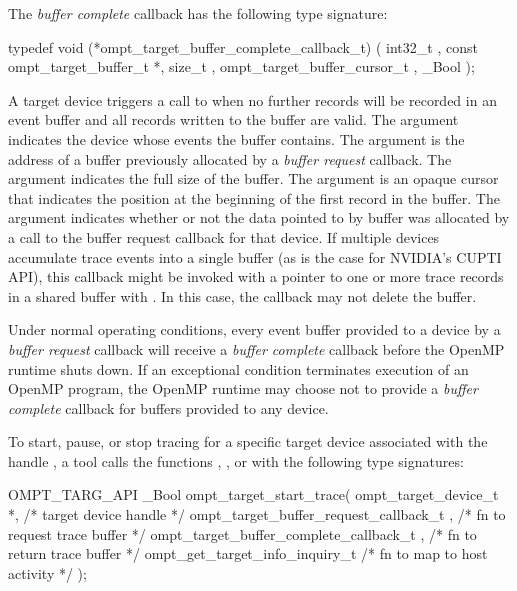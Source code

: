 \documentclass{article}
\begin{document}
The \emph{buffer complete} callback has the following type signature: 
\begin{boxedcode}
typedef void (*ompt\_target\_buffer\_complete\_callback\_t) (
  int32\_t , 
  const ompt\_target\_buffer\_t *,
  size\_t ,
  ompt\_target\_buffer\_cursor\_t ,
  \_Bool 
);
\end{boxedcode}
A target device triggers a call to  when no further records will be recorded in an event buffer and all records written to the buffer are valid. 
The argument  indicates the device whose events the buffer contains. The argument  is the address of a buffer previously allocated by a \emph{buffer request} callback. The argument  indicates the full size of the buffer. The argument  is an opaque cursor that indicates the position at the beginning of the first record in the buffer. The argument  indicates whether or not the data pointed to by buffer was allocated by a call to the buffer request callback for that device. If multiple devices accumulate trace events into a single buffer (as is the case for NVIDIA's CUPTI API), this callback might be invoked with a pointer to one or more trace records in a shared buffer with . In this case, the callback may not delete the buffer.

Under normal operating conditions, every event buffer provided to a device by a \emph{buffer request} callback will receive a \emph{buffer complete} callback before the OpenMP runtime shuts down. If an exceptional condition terminates  execution of an OpenMP program, the OpenMP runtime may choose not to provide a \emph{buffer complete} callback for buffers provided to any device.

To start, pause, or stop tracing for a specific target device associated with the handle , 
a tool calls the functions , , or  with the following type signatures:
\begin{boxedcode}
OMPT\_TARG\_API \_Bool ompt\_target\_start\_trace(
  ompt\_target\_device\_t *,                     /* target device handle       */
  ompt\_target\_buffer\_request\_callback\_t ,    /* fn to request trace buffer */
  ompt\_target\_buffer\_complete\_callback\_t ,  /* fn to return trace buffer  */
  ompt\_get\_target\_info\_inquiry\_t            /* fn to map to host activity */
);
\end{boxedcode}
\end{document}
